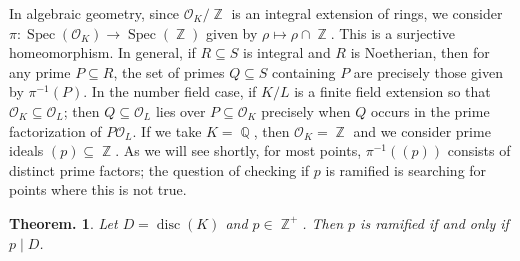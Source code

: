 \documentclass[11pt, a4paper]{memoir}
\DeclareMathOperator{\Q}{{\mathbb{Q}}}
\DeclareMathOperator{\Z}{{\mathbb{Z}}}
\theoremstyle{change}
\newtheorem{theorem}{Theorem.}[section]
\theoremstyle{plain}
\theoremstyle{nonumberplain}
\DeclareMathOperator{\disc}{disc}
\DeclareMathOperator{\Spec}{Spec}
\numberwithin{equation}{section}
\begin{document}
In algebraic geometry, since $\mathcal{O}_K/\Z$ is an integral extension of rings, we consider $\pi:\Spec(\mathcal{O}_K)\to\Spec(\Z)$ given by $\rho\mapsto\rho\cap\Z$.
This is a surjective homeomorphism.
In general, if $R\subseteq S$ is integral and $R$ is Noetherian, then for any prime $P\subseteq R$, the set of primes $Q\subseteq S$ containing $P$ are precisely those given by $\pi^{-1}(P)$.
In the number field case, if $K/L$ is a finite field extension so that $\mathcal{O}_K\subseteq\mathcal{O}_L$; then $Q\subseteq\mathcal{O}_L$ lies over $P\subseteq\mathcal{O}_K$ precisely when $Q$ occurs in the prime factorization of $P\mathcal{O}_L$.
If we take $K=\Q$, then $\mathcal{O}_K=\Z$ and we consider prime ideals $(p)\subseteq\Z$.
As we will see shortly, for most points, $\pi^{-1}((p))$ consists of distinct prime factors; the question of checking if $p$ is ramified is searching for points where this is not true.
\begin{theorem}\label{thm:id-ram}
    Let $D=\disc(K)$ and $p\in\Z^+$.
    Then $p$ is ramified if and only if $p\mid D$.
\end{theorem}
\end{document}

